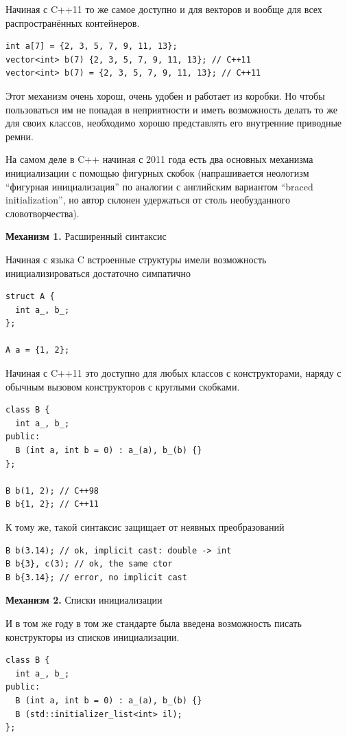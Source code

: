 \documentclass[a4paper,12pt,oneside]{article}
\begin{document}
Начиная с C++11 то же самое доступно и для векторов и вообще для всех распространённых контейнеров.

\begin{lstlisting}
int a[7] = {2, 3, 5, 7, 9, 11, 13};
vector<int> b(7) {2, 3, 5, 7, 9, 11, 13}; // C++11
vector<int> b(7) = {2, 3, 5, 7, 9, 11, 13}; // C++11
\end{lstlisting}

Этот механизм очень хорош, очень удобен и работает из коробки. Но чтобы пользоваться им не попадая в неприятности и иметь возможность делать то же для своих классов, необходимо хорошо представлять его внутренние приводные ремни.

На самом деле в C++ начиная с 2011 года есть два основных механизма инициализации с помощью фигурных скобок (напрашивается неологизм ``фигурная инициализация'' по аналогии с английским вариантом ``braced initialization'', но автор склонен удержаться от столь необузданного словотворчества).

\textbf{Механизм 1.} Расширенный синтаксис

Начиная с языка C встроенные структуры имели возможность инициализироваться достаточно симпатично

\begin{lstlisting}
struct A {
  int a_, b_;
};

A a = {1, 2};
\end{lstlisting}

Начиная с C++11 это доступно для любых классов с конструкторами, наряду с обычным вызовом конструкторов с круглыми скобками.

\begin{lstlisting}
class B {
  int a_, b_;
public:  
  B (int a, int b = 0) : a_(a), b_(b) {}
};

B b(1, 2); // C++98
B b{1, 2}; // C++11
\end{lstlisting}

К тому же, такой синтаксис защищает от неявных преобразований

\begin{lstlisting}
B b(3.14); // ok, implicit cast: double -> int
B b{3}, c(3); // ok, the same ctor
B b{3.14}; // error, no implicit cast
\end{lstlisting}

\textbf{Механизм 2.} Списки инициализации

И в том же году в том же стандарте была введена возможность писать конструкторы из списков инициализации.

\begin{lstlisting}
class B {  
  int a_, b_;
public:  
  B (int a, int b = 0) : a_(a), b_(b) {}
  B (std::initializer_list<int> il);
};
\end{lstlisting}
\end{document}
